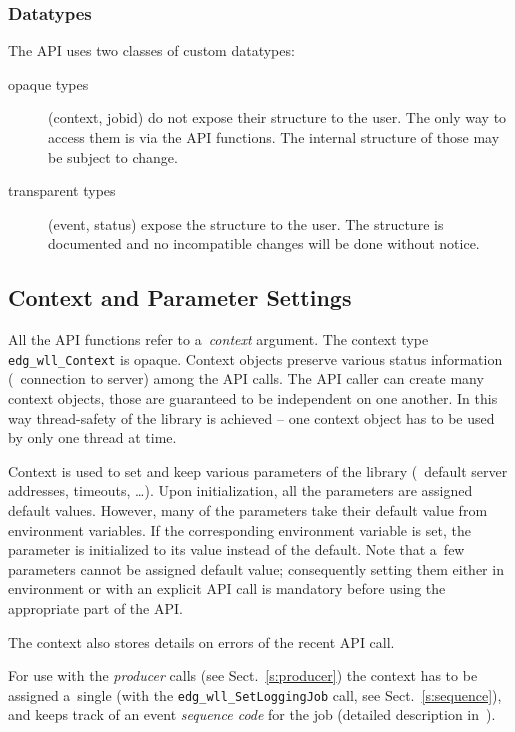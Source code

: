 \subsubsection{Datatypes}
The API uses two classes of custom datatypes:
\begin{description}
\item[opaque types] (\eg context, jobid) do not expose their structure
to the user.
The only way to access them is via the API functions.
The internal structure of those may be subject to change.

\item[transparent types] (\eg event, status) expose the structure to the
user. The structure is documented and no incompatible changes will be done
without notice.
\end{description}

\subsection{Context and Parameter Settings}
\label{s:context}

All the API functions refer to a~\emph{context} argument.
The context type \verb'edg_wll_Context' is opaque.
Context objects preserve various status information
(\eg\ connection to server) among the API calls.
The API caller can create many context objects, those are guaranteed
to be independent on one another.
In this way thread-safety of the library is achieved --
one context object has to be used by only one thread at time.

Context is used to set and keep various parameters of the library
(\eg\ default server addresses, timeouts, \dots).
Upon initialization, all the parameters are assigned default values.
However, many of the parameters take their default value from environment
variables. If the corresponding environment variable is set,
the parameter is initialized to its value instead of the default.
Note that a~few parameters cannot be assigned default value; consequently
setting them either in environment or with an explicit API call
is mandatory before using the appropriate part of the API.

The context also stores details on errors of the recent API call.

For use with the \emph{producer} calls (see Sect.~\ref{s:producer})
the context has to be assigned a~single \jobid
(with the \verb'edg_wll_SetLoggingJob' call, see Sect.~\ref{s:sequence}),
and keeps track of an event \emph{sequence code} for the job 
(detailed description in~\cite{lbarch}).

